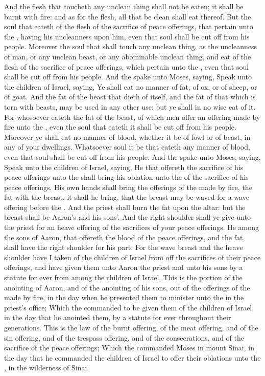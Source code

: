 \begin{biblechapter}
\verse And the flesh that toucheth any unclean thing shall not be eaten; it shall be burnt with fire: and as for the flesh, all that be clean shall eat thereof.
\verse But the soul that eateth of the flesh of the sacrifice of peace offerings, that pertain unto the \LORD, having his uncleanness upon him, even that soul shall be cut off from his people.
\verse Moreover the soul that shall touch any unclean thing, as the uncleanness of man, or any unclean beast, or any abominable unclean thing, and eat of the flesh of the sacrifice of peace offerings, which pertain unto the \LORD, even that soul shall be cut off from his people.
 And the \LORD spake unto Moses, saying,
\verse Speak unto the children of Israel, saying, Ye shall eat no manner of fat, of ox, or of sheep, or of goat.
\verse And the fat of the beast that dieth of itself, and the fat of that which is torn with beasts, may be used in any other use: but ye shall in no wise eat of it.
\verse For whosoever eateth the fat of the beast, of which men offer an offering made by fire unto the \LORD, even the soul that eateth it shall be cut off from his people.
\verse Moreover ye shall eat no manner of blood, whether it be of fowl or of beast, in any of your dwellings.
\verse Whatsoever soul it be that eateth any manner of blood, even that soul shall be cut off from his people.
 And the \LORD spake unto Moses, saying,
\verse Speak unto the children of Israel, saying, He that offereth the sacrifice of his peace offerings unto the \LORD shall bring his oblation unto the \LORD of the sacrifice of his peace offerings.
\verse His own hands shall bring the offerings of the \LORD made by fire, the fat with the breast, it shall he bring, that the breast may be waved for a wave offering before the \LORD.
\verse And the priest shall burn the fat upon the altar: but the breast shall be Aaron's and his sons'.
\verse And the right shoulder shall ye give unto the priest for an heave offering of the sacrifices of your peace offerings.
\verse He among the sons of Aaron, that offereth the blood of the peace offerings, and the fat, shall have the right shoulder for his part.
\verse For the wave breast and the heave shoulder have I taken of the children of Israel from off the sacrifices of their peace offerings, and have given them unto Aaron the priest and unto his sons by a statute for ever from among the children of Israel.
\verse This is the portion of the anointing of Aaron, and of the anointing of his sons, out of the offerings of the \LORD made by fire, in the day when he presented them to minister unto the \LORD in the priest's office;
\verse Which the \LORD commanded to be given them of the children of Israel, in the day that he anointed them, by a statute for ever throughout their generations.
\verse This is the law of the burnt offering, of the meat offering, and of the sin offering, and of the trespass offering, and of the consecrations, and of the sacrifice of the peace offerings;
\verse Which the \LORD commanded Moses in mount Sinai, in the day that he commanded the children of Israel to offer their oblations unto the \LORD, in the wilderness of Sinai.
\end{biblechapter}


